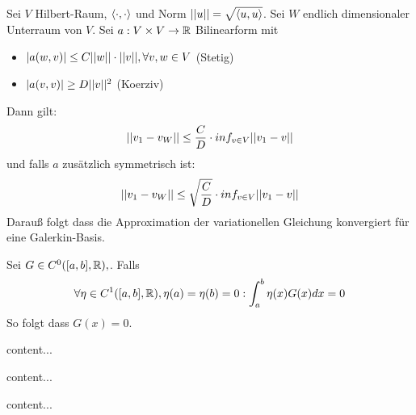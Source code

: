 \begin{satz}
	Sei $V$ Hilbert-Raum, $\langle \cdot, \cdot \rangle$ und Norm $||u|| = \sqrt{\langle u, u \rangle}$. Sei $W$ endlich dimensionaler Unterraum von $V$. Sei $a : V \times V \rightarrow \mathbb{R}$ Bilinearform mit
	\begin{itemize}[noitemsep]
		\item $|a(w,v)| \leq C ||w|| \cdot ||v||, \forall v,w \in V$ (Stetig)
		\item $|a(v,v)| \geq D ||v||^2$ (Koerziv) 
	\end{itemize}
	Dann gilt:
	\begin{align*}
		||v_1 - v_W|| \leq \frac{C}{D}\cdot inf_{v \in V} ||v_1 - v||
	\end{align*}
	und falls $a$ zusätzlich symmetrisch ist:
	\begin{align*}
	||v_1 - v_W|| \leq \sqrt{\frac{C}{D}} \cdot inf_{v \in V} ||v_1 - v||
\end{align*}
	Darauß folgt dass die Approximation der variationellen Gleichung konvergiert für eine Galerkin-Basis.
\end{satz}

\begin{satz}
	Sei $G \in C^{0}([a,b],\mathbb{R}), $. Falls 
	\begin{align*}
		\forall \eta \in C^{1}([a,b],\mathbb{R}), \eta(a) = \eta (b) = 0 :  \int_{a}^{b} \eta(x) G(x) dx = 0 
	\end{align*}
	So folgt dass $G(x) = 0$.
\end{satz}

\begin{definition}[Eigenfunktionen]
	content...
\end{definition}

\begin{definition}[Faltung]
	content...
\end{definition}


\begin{definition}[Distribution]
	content...
\end{definition}

\pagebreak